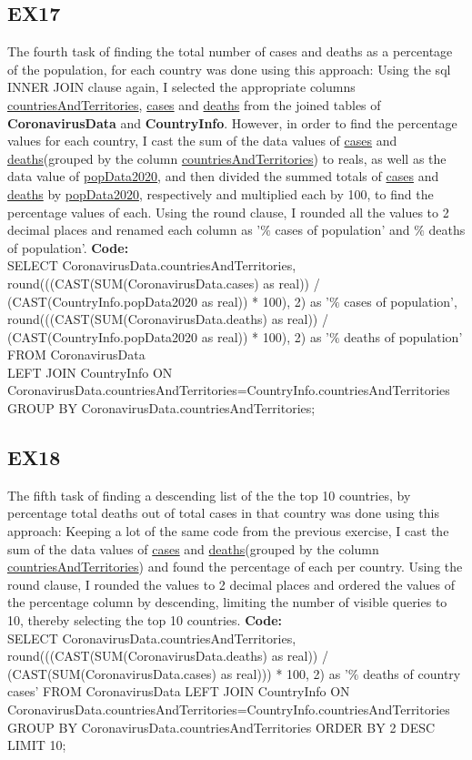 \documentclass[10pt]{article}
\begin{document}
\subsection{EX17}
The fourth task of finding the total number of cases and deaths as a percentage of the population, for each country was done using this approach:
Using the sql INNER JOIN clause again, I selected the appropriate columns \underline{countriesAndTerritories}, \underline{cases} and \underline{deaths} from the joined tables of \textbf{CoronavirusData} and \textbf{CountryInfo}. However, in order to find the percentage values for each country, I cast the sum of the data values of \underline{cases} and \underline{deaths}(grouped by the column \underline{countriesAndTerritories}) to reals, as well as the data value of \underline{popData2020}, and then divided the summed totals of \underline{cases} and \underline{deaths} by \underline{popData2020}, respectively and multiplied each by 100, to find the percentage values of each. Using the round clause, I rounded all the values to 2 decimal places and renamed each column as '$\%$ cases of population' and $\%$ deaths of population'.  \textbf{Code:} \\
SELECT CoronavirusData.countriesAndTerritories,
       round(((CAST(SUM(CoronavirusData.cases) as real)) / (CAST(CountryInfo.popData2020 as real)) * 100), 2) as '$\%$ cases of population',\\
       round(((CAST(SUM(CoronavirusData.deaths) as real)) / (CAST(CountryInfo.popData2020 as real)) * 100), 2) as '$\%$ deaths of population'
FROM CoronavirusData \\
LEFT JOIN CountryInfo ON CoronavirusData.countriesAndTerritories=CountryInfo.countriesAndTerritories
GROUP BY CoronavirusData.countriesAndTerritories;

\subsection{EX18}
The fifth task of finding a descending list of the the top 10 countries, by percentage total deaths out of total cases in that country was done using this approach:
Keeping a lot of the same code from the previous exercise, I cast the sum of the data values of \underline{cases} and \underline{deaths}(grouped by the column \underline{countriesAndTerritories}) and found the percentage of each per country. Using the round clause, I rounded the values to 2 decimal places and ordered the values of the percentage column by descending, limiting the number of visible queries to 10, thereby selecting the top 10 countries.  \textbf{Code:} \\
SELECT CoronavirusData.countriesAndTerritories,
       round(((CAST(SUM(CoronavirusData.deaths) as real)) / (CAST(SUM(CoronavirusData.cases) as real))) * 100, 2) as '$\%$ deaths of country cases'
FROM CoronavirusData LEFT JOIN CountryInfo ON CoronavirusData.countriesAndTerritories=CountryInfo.countriesAndTerritories
GROUP BY CoronavirusData.countriesAndTerritories ORDER BY 2 DESC
LIMIT 10;
\end{document}
